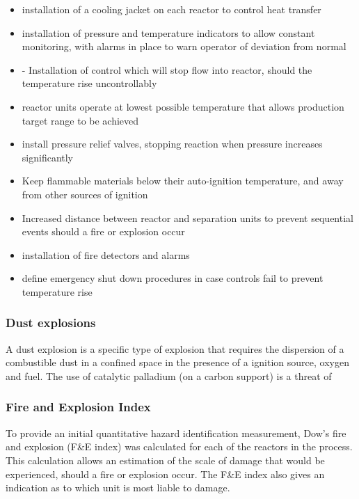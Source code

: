 \begin{itemize}
    \item installation of a cooling jacket on each reactor to control heat transfer
    \item installation of pressure and temperature indicators to allow constant monitoring, with alarms in place to warn operator of deviation from normal
    \item -	Installation of control which will stop flow into reactor, should the temperature rise uncontrollably
    \item reactor units operate at lowest possible temperature that allows production target range to be achieved
    \item install pressure relief valves, stopping reaction when pressure increases significantly 
    \item Keep flammable materials below their auto-ignition temperature, and away from other sources of ignition
    \item Increased distance between reactor and separation units to prevent sequential events should a fire or explosion occur
    \item installation of fire detectors and alarms
    \item define emergency shut down procedures in case controls fail to prevent temperature rise
\end{itemize}


\subsubsection{Dust explosions}

A dust explosion is a specific type of explosion that requires the dispersion of a combustible dust in a confined space in the presence of a ignition source, oxygen and fuel. The use of catalytic  palladium (on a carbon support) is a threat of 



\subsubsection{Fire and Explosion Index}

To provide an initial quantitative hazard identification measurement, Dow's fire and explosion (F\&E index) was calculated for each of the reactors in the process. This calculation allows an estimation of the scale of damage that would be experienced, should a fire or explosion occur. The F\&E index also gives an indication as to which unit is most liable to damage. 


